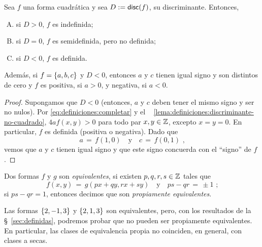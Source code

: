 \begin{teoDefiniciones}\label{teo:definiciones:valores}
	Sea $f$ una forma cuadr\'atica y sea $D:=\mathsf{disc}(f)$,
	su discriminante. Entonces,
	\begin{enumerate}[(A)]
		\item\label{item:definiciones:valores:indefinida}
			si $D>0$, $f$ es indefinida;
		\item\label{item:definiciones:valores:semidefinida}
			si $D=0$, $f$ es semidefinida, pero no definida;
		\item\label{item:definiciones:valores:definida}
			si $D<0$, $f$ es definida.
	\end{enumerate}
	Adem\'as, si $f=\left\{a,b,c\right\}$ y $D<0$, entonces $a$ y $c$
	tienen igual signo y son distintos de cero y $f$ es positiva,
	si $a>0$, y negativa, si $a<0$.
\end{teoDefiniciones}

\begin{proof}
	Supongamos que $D<0$
	(entonces, $a$ y $c$ deben tener el mismo signo y ser no nulos).
	Por \eqref{eq:definiciones:completar} y el \lemaname~%
	\ref{lema:definiciones:discriminante-no-cuadrado},
	$4af(x,y)>0$ para todo par $x,y\in\mathbb{Z}$, excepto
	$x=y=0$. En particular, $f$ es definida (positiva o
	negativa). Dado que
	\begin{displaymath}
		a\,=\,f(1,0)\quad\text{y}\quad
			c\,=\,f(0,1)
		\text{ ,}
	\end{displaymath}
	vemos que $a$ y $c$ tienen igual signo y que este
	signo concuerda con el ``signo'' de $f$.
\end{proof}

\begin{defDefiniciones}\label{def:definiciones:equivalencia}
	Dos formas $f$ y $g$ son \emph{equivalentes}, si existen
	$p,q,r,s\in\mathbb{Z}$ tales que
	\begin{displaymath}
		f(x,y)\,=\,g(px+qy,rx+sy)
		\quad\text{y}\quad
		ps-qr\,=\,\pm 1
		\text{ ;}
	\end{displaymath}
	si $ps-qr=1$, entonces decimos que son
	\emph{propiamente equivalentes}.
\end{defDefiniciones}

\begin{ejemDefiniciones}\label{ejem:definiciones:equivalencia}
	Las formas $\left\{2,-1,3\right\}$ y $\left\{2,1,3\right\}$ son equivalentes,
	pero, con los resultados de la \S~\ref{sec:definidas}, podremos
	probar que no pueden ser propiamente equivalentes.
	En particular, las clases de equivalencia propia no coinciden,
	en general, con clases a secas.
\end{ejemDefiniciones}

